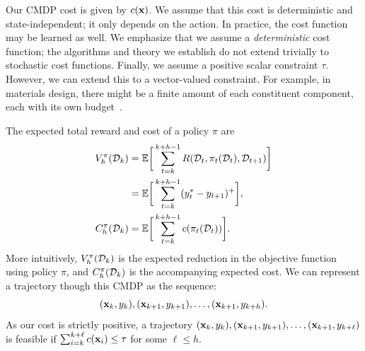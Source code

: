 Our CMDP cost is given by $c({\mathbf{x}})$. 
We assume that this cost is deterministic and state-independent; it only depends on the action. 
In practice, the cost function may be learned as well. 
We emphasize that we assume a \textit{deterministic} cost function; the algorithms and theory we establish do not extend trivially to stochastic cost functions.
Finally, we assume a positive scalar constraint $\tau$. 
However, we can extend this to a vector-valued constraint. 
For example, in materials design, there might be a finite amount of each constituent component, each with its own budget~\citep{abdolshah2019costaware}.  

The expected total reward and cost of a policy $\pi$ are
\begin{align*}
    V_h^\pi({\mathcal{D}}_k) &= {\mathbb E} \bigg[ \sum_{t=k}^{k + h-1} R({\mathcal{D}}_t, \pi_t({\mathcal{D}}_t), {\mathcal{D}}_{t+1}) \bigg] \\
    &= {\mathbb E} \bigg[ \sum_{t=k}^{k + h-1} (y^*_t - y_{t+1} )^+ \bigg] \nonumber, \\
    C_h^\pi({\mathcal{D}}_k) &= {\mathbb E} \bigg[ \sum_{t=k}^{k + h-1} c(\pi_t({\mathcal{D}}_t)) \bigg].
\end{align*}
More intuitively, $V_h^\pi({\mathcal{D}}_k)$ is the expected reduction in the objective function using policy $\pi$, and $C_h^\pi({\mathcal{D}}_k)$ is the accompanying expected cost. 
We can represent a trajectory though this CMDP as the sequence:
\[
    ({\mathbf{x}}_k, y_k), ({\mathbf{x}}_{k+1}, y_{k+1}), \dots, ({\mathbf{x}}_{k+1}, y_{k+h}).
\]
As our cost is strictly positive, a trajectory $({\mathbf{x}}_k, y_k), ({\mathbf{x}}_{k+1}, y_{k+1}), \dots, ({\mathbf{x}}_{k+1}, y_{k+\ell})$ is feasible if $\sum_{i=k}^{k+\ell} c({\mathbf{x}}_i) \leq \tau$ for some $\ell \leq h$.



